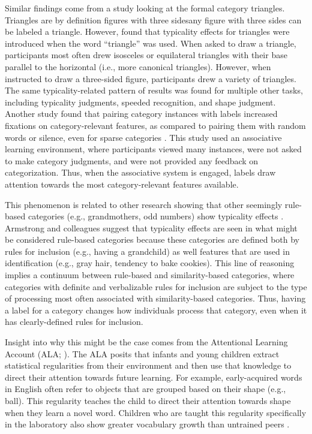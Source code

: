 \documentclass[../dissertation.tex]{subfiles}
\begin{document}
	 Similar findings come from a study looking at the formal category triangles. Triangles are by definition figures with three sides\textemdash any figure with three sides can be labeled a triangle. However, \citet{Lupyan2017} found that typicality effects for triangles  were introduced when the word “triangle” was used. When asked to draw a triangle, participants most often drew isosceles or equilateral triangles with their base parallel to the horizontal (i.e., more canonical triangles). However, when instructed to draw a three-sided figure, participants drew a variety of triangles. The same typicality-related pattern of results was found for multiple other tasks, including typicality judgments, speeded recognition, and shape judgment. Another study found that pairing category instances with labels increased fixations on category-relevant features, as compared to pairing them with random words or silence, even for sparse categories \citep{Barnhart2018}. This study used an associative learning environment, where participants viewed many instances, were not asked to make category judgments, and were not provided any feedback on categorization. Thus, when the associative system is engaged, labels draw attention towards the most category-relevant features available. \par
	  This phenomenon is related to other research showing that other seemingly rule-based categories (e.g., grandmothers, odd numbers) show typicality effects \citep{Armstrong1983,Lupyan2013a}. Armstrong and colleagues suggest that typicality effects are seen in what might be considered rule-based categories because these categories are defined both by rules for inclusion (e.g., having a grandchild) as well features that are used in identification (e.g., gray hair, tendency to bake cookies). This line of reasoning implies a continuum between rule-based and similarity-based categories, where categories with definite and verbalizable rules for inclusion are subject to the type of processing most often associated with similarity-based categories. Thus, having a label for a category changes how individuals process that category, even when it has clearly-defined rules for inclusion. \par
	Insight into why this might be the case comes from the Attentional Learning Account (ALA; \citealp{Smith2002,Yoshida2005}). The ALA posits that infants and young children extract statistical regularities from their environment and then use that knowledge to direct their attention towards future learning. For example, early-acquired words in English often refer to objects that are grouped based on their shape (e.g., ball). This regularity teaches the child to direct their attention towards shape when they learn a novel word. Children who are taught this regularity specifically in the laboratory also show greater vocabulary growth than untrained peers \citep{Smith2002}. \par
\end{document}
